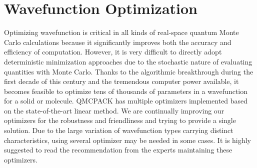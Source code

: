 \section{Wavefunction Optimization}
Optimizing wavefunction is critical in all kinds of real-space quantum Monte Carlo calculations
because it significantly improves both the accuracy and efficiency of computation.
However, it is very difficult to directly adopt deterministic minimization approaches due to the stochastic nature of evaluating quantities with Monte Carlo.
Thanks to the algorithmic breakthrough during the first decade of this century and the tremendous computer power available, 
it becomes feasible to optimize tens of thousands of parameters in a wavefunction for a solid or molecule.
QMCPACK has multiple optimizers implemented based on the state-of-the-art linear method.
We are continually improving our optimizers for the robustness and friendliness and trying to provide a single solution.
Due to the large variation of wavefunction types carrying distinct characteristics, using several optimizer may be needed in some cases.
It is highly suggested to read the recommendation from the experts maintaining these optimizers.

